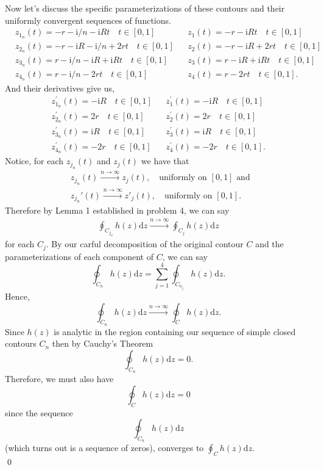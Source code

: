 \documentclass[10pt]{amsart}
\newcommand{\D}{\mathrm{d}}
\newcommand{\I}{\mathrm{i}}
\theoremstyle{nonumberplain}
\begin{document}
\begin{enumerate}[label={\bf {\arabic*}:}]
\begin{itemize}
\noindent
Now let's discuss the specific parameterizations of these contours and their uniformly convergent sequences of functions.
\begin{align*}
&z_{1_n}(t) = -r - \I/n -\I R t \quad t \in [0, 1]& &z_1(t) = -r -\I R t \quad t \in [0, 1]& \\
&z_{2_n}(t) = -r - \I R - \I/n + 2rt \quad t \in [0, 1]& &z_2(t) = -r - \I R + 2rt \quad t \in [0, 1]& \\
&z_{3_n}(t) = r - \I/n -\I R + \I R t \quad t \in [0, 1]& &z_3(t) = r -\I R + \I R t \quad t \in [0, 1]& \\
&z_{4_n}(t) = r - \I/n - 2rt \quad t \in [0, 1]& &z_4(t) = r - 2rt \quad t \in [0, 1].&
\end{align*}
And their derivatives give us,
\begin{align*}
&z_{1_n}^\prime(t) = -\I R \quad t \in [0, 1]& &z_1^\prime(t) = -\I R \quad t \in [0, 1]& \\
&z_{2_n}^\prime(t) = 2r \quad t \in [0, 1]& &z_2^\prime(t) = 2r \quad t \in [0, 1]& \\
&z_{3_n}^\prime(t) = \I R \quad t \in [0, 1]& &z_3^\prime(t) = \I R \quad t \in [0, 1]& \\
&z_{4_n}^\prime(t) = - 2r \quad t \in [0, 1]& &z_4^\prime(t) = - 2r \quad t \in [0, 1].&
\end{align*}
Notice, for each $z_{j_n}(t)$ and $z_j(t)$ we have that
\begin{align*}
	&z_{j_n}(t) \overset{n \to \infty}{\longrightarrow} z_j(t),  \quad \text{uniformly on } [0,1] \text{ and }\\
        &z_{j_n}'(t) \overset{n \to \infty}{\longrightarrow} z'_j(t), \quad \text{uniformly on } [0,1].
\end{align*}
Therefore by Lemma 1 established in problem 4, we can say
\begin{align*}
\oint_{C_{j_n}}h(z)\D z \overset{n \to \infty}{\longrightarrow} \oint_{C_j}h(z)\D z
\end{align*}
for each $C_j$.
By our carful decomposition of the original contour $C$ and the parameterizations of each component of $C$, we can say 
$$\oint_{C_n} h(z) \D z = \sum_{j = 1}^{4} \oint_{C_{n_j}}h(z) \D z.$$
Hence,
$$\oint_{C_n}h(z)\D z \overset{n \to \infty}{\longrightarrow} \oint_{C}h(z)\D z.$$
Since $h(z)$ is analytic in the region containing our sequence of simple closed contours $C_n$ then by Cauchy's Theorem
$$
\oint_{C_n}h(z)\D z = 0.
$$
Therefore, we must also have
$$\oint_{C}h(z)\D z = 0$$
since the sequence $$\oint_{C_n}h(z)\D z$$ (which turns out is a sequence of zeros), converges to $\oint_{C}h(z)\D z$. \\
\qed \\


\end{itemize}
\end{enumerate}
\end{document}
